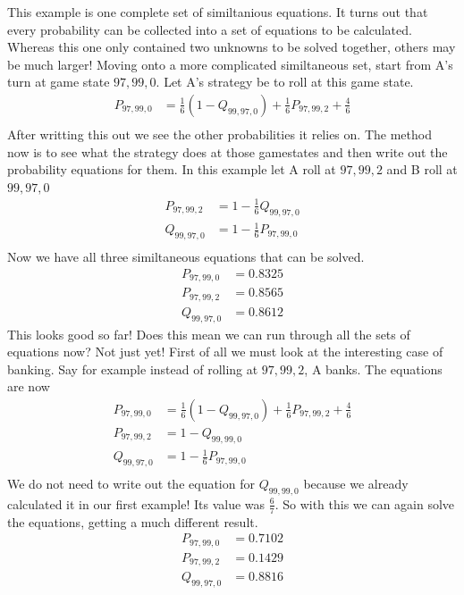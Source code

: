\documentclass[a4paper,titlepage]{article}
\begin{document}
This example is one complete set of similtanious equations. It turns out that every probability can be collected into a set of equations to be calculated.
Whereas this one only contained two unknowns to be solved together, others may be much larger!
Moving onto a more complicated similtaneous set, start from A's turn at game state $97,99,0$. Let A's strategy be to roll at this game state.
\begin{align*}
	P_{97,99,0} &= \frac{1}{6}(1 - Q_{99,97,0})+\frac{1}{6}P_{97,99,2}+\frac{4}{6}\\
\end{align*}
After writting this out we see the other probabilities it relies on. The method now is to see what the strategy does at those gamestates and then write out the probability equations for them.
In this example let A roll at $97,99,2$ and B roll at $99,97,0$
\begin{align*}
	P_{97,99,2} &= 1 - \frac{1}{6}Q_{99,97,0}\\
	Q_{99,97,0} &= 1 - \frac{1}{6}P_{97,99,0}\\
\end{align*}
Now we have all three similtaneous equations that can be solved.
\begin{align*}
	P_{97,99,0} &= 0.8325\\
	P_{97,99,2} &= 0.8565\\
	Q_{99,97,0} &= 0.8612
\end{align*}
This looks good so far! Does this mean we can run through all the sets of equations now?
Not just yet! First of all we must look at the interesting case of banking. Say for example instead of rolling at $97,99,2$, A banks.
The equations are now
\begin{align*}
	P_{97,99,0} &= \frac{1}{6}(1 - Q_{99,97,0})+\frac{1}{6}P_{97,99,2}+\frac{4}{6}\\
	P_{97,99,2} &= 1 - Q_{99,99,0}\\
	Q_{99,97,0} &= 1 - \frac{1}{6}P_{97,99,0}\\
\end{align*}
We do not need to write out the equation for $Q_{99,99,0}$ because we already calculated it in our first example! Its value was $\frac{6}{7}$.
So with this we can again solve the equations, getting a much different result.
\begin{align*}
	P_{97,99,0} &= 0.7102\\
	P_{97,99,2} &= 0.1429\\
	Q_{99,97,0} &= 0.8816
\end{align*}
\end{document}
